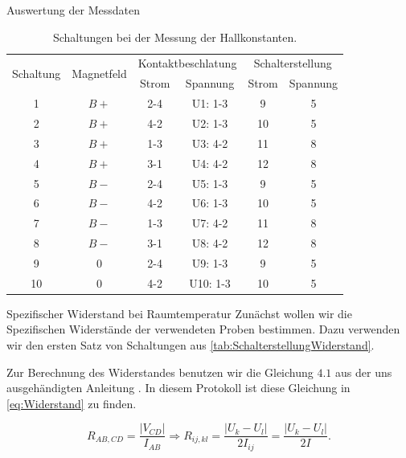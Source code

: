 \documentclass[pdftex, a4paper,11pt, twoside, ngerman]{report}
\begin{document}
\begin{chapter}{Auswertung der Messdaten}
    \begin{table}[htbp]
      \centering
      \footnotesize
      \begin{tabular}{c|c|c|c|c|c}
        \multirow{2}{*}{Schaltung} & \multirow{2}{*}{Magnetfeld} &
        \multicolumn{2}{c|}{Kontaktbeschlatung} &
        \multicolumn{2}{c}{Schalterstellung} \\
        & & Strom & Spannung & Strom & Spannung \\ \hline \hline
        1  & $B+$ & 2-4 & U1:  1-3 & 9  & 5 \\
        2  & $B+$ & 4-2 & U2:  1-3 & 10 & 5 \\
        3  & $B+$ & 1-3 & U3:  4-2 & 11 & 8 \\
        4  & $B+$ & 3-1 & U4:  4-2 & 12 & 8 \\
        5  & $B-$ & 2-4 & U5:  1-3 & 9  & 5 \\
        6  & $B-$ & 4-2 & U6:  1-3 & 10 & 5 \\
        7  & $B-$ & 1-3 & U7:  4-2 & 11 & 8 \\
        8  & $B-$ & 3-1 & U8:  4-2 & 12 & 8 \\
        9  & $0$  & 2-4 & U9:  1-3 & 9  & 5 \\
        10 & $0$  & 4-2 & U10: 1-3 & 10 & 5 \\
      \end{tabular}
      \caption{Schaltungen bei der Messung der Hallkonstanten.}
      \label{tab:SchalterstellungHall}
    \end{table}
    
    \begin{section}{Spezifischer Widerstand bei Raumtemperatur}
      \label{chp:AuswertungSpezifischerWiderstandRaumtemperatur}
      Zunächst wollen wir die Spezifischen Widerstände der verwendeten Proben
      bestimmen.
      Dazu verwenden wir den ersten Satz von Schaltungen aus
      \cref{tab:SchalterstellungWiderstand}.
      
      Zur Berechnung des Widerstandes benutzen wir die Gleichung $4.1$ aus
      der uns ausgehändigten Anleitung \cite{bib:Anleitung}.
      In diesem Protokoll ist diese Gleichung in \cref{eq:Widerstand} zu finden.
      
      \begin{equation}
        \label{eq:Widerstand}
        R_{AB,CD}=\frac{|V_{CD}|}{I_{AB}} \Longrightarrow R_{ij,kl}=
        \frac{|U_{k}-U_{l}|}{2I_{ij}} = \frac{|U_{k}-U_{l}|}{2I}.
      \end{equation}
      

\end{section}
\end{chapter}
\end{document}
